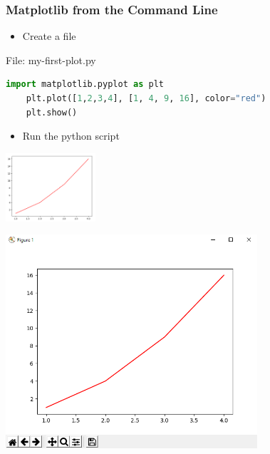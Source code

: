 \begin{frame}[fragile]
	\frametitle{Matplotlib from the Command Line}
    \begin{itemize}
      \item Create a file 
    \end{itemize}
    \begin{block}{File: my-first-plot.py}
    \begin{lstlisting}[language=Python]
    import matplotlib.pyplot as plt
    plt.plot([1,2,3,4], [1, 4, 9, 16], color="red")
    plt.show()
    \end{lstlisting}      
		\end{block}		
    \begin{itemize}
      \item Run the python script 
    \end{itemize}			
    \begin{center}
      \includegraphics[width=0.25\textwidth]{screenshots/plt-2.png}
    \end{center}						
\end{frame}

\begin{frame}[fragile]
   \vspace{-1cm}
    \begin{center}
      \includegraphics[width=0.7\textwidth]{screenshots/plt-1.png}
    \end{center}						
\end{frame}

